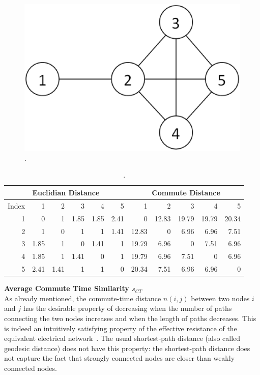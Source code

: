 \begin{figure}[tbh]
\centering
\includegraphics[width=.4\textwidth]{fig/comm-dist-demo.eps}
\caption{\label{fig:comm-dist-demo} .}
\end{figure}

\begin{table}[ht]
\begin{tabular}{r|r|r|r|r|r || r|r|r|r|r}
\hline\hline
\multicolumn{6}{c||}{Euclidian Distance}	&	\multicolumn{5}{c}{Commute Distance}		\\
\hline\hline							
Index	&	1	&	2	&	3	&	4	&	5	&	1	&	2	&	3	&	4	&	5	\\
\hline
1	&	0	&	1	&	1.85	&	1.85	&	2.41	&	0	&	12.83	&	19.79	&	19.79	&	20.34	\\
\hline
2	&	1	&	0	&	1	&	1	&	1.41	&	12.83	&	0	&	6.96	&	6.96	&	7.51	\\
\hline
3	&	1.85	&	1	&	0	&	1.41	&	1	&	19.79	&	6.96	&	0	&	7.51	&	6.96	\\
\hline
4	&	1.85	&	1	&	1.41	&	0	&	1	&	19.79	&	6.96	&	7.51	&	0	&	6.96	\\
\hline
5	&	2.41	&	1.41	&	1	&	1	&	0	&	20.34	&	7.51	&	6.96	&	6.96	&	0	\\
\hline\hline
\end{tabular}
\caption{\label{tbl:comp-eucl-comm} .}
\end{table}
\textbf{Average Commute Time Similarity $s_{CT}$}\\

As already mentioned, the commute-time distance $n(i,j)$ between two nodes $i$ and $j$ has the desirable property of decreasing when the number of paths connecting the two nodes increases and when the length of paths decreases. This is indeed an intuitively satisfying property of the effective resistance of the equivalent electrical network~\cite{Doyle}. The usual shortest-path distance (also called geodesic distance) does not have this property: the shortest-path distance does not capture the fact that strongly connected nodes are closer than weakly connected nodes.


